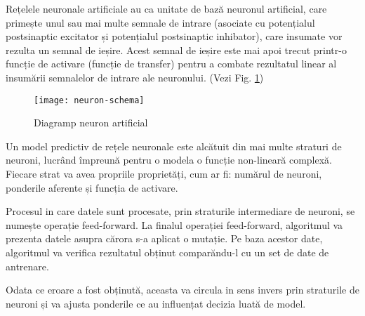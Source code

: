 	
	Rețelele neuronale artificiale au ca unitate de bază neuronul artificial, care primește unul sau mai multe semnale de intrare (asociate cu potențialul postsinaptic excitator și potențialul postsinaptic inhibator), care insumate vor rezulta un semnal de ieșire. Acest semnal de ieșire este mai apoi trecut printr-o funcție de activare (funcție de transfer) pentru a combate rezultatul linear al insumării semnalelor de intrare ale neuronului. (Vezi Fig. \ref{fig:neuron-schema})
	
	\begin{figure}[H]
		\texttt{[image: neuron-schema]}  
		\caption{\label{fig:neuron-schema} Diagramp neuron artificial 
		\protect 
		\cite{ann}}
	\end{figure}
	
	
	Un model predictiv de rețele neuronale este alcătuit din mai multe straturi de neuroni, lucrând împreună pentru o modela o funcție non-lineară complexă.
	Fiecare strat va avea propriile proprietăți, cum ar fi: numărul de neuroni, ponderile aferente și funcția de activare.
	
	Procesul in care datele sunt procesate, prin straturile intermediare de neuroni, se numește operație feed-forward. La finalul operației feed-forward, algoritmul va prezenta datele asupra cărora s-a aplicat o mutație. Pe baza acestor date, algoritmul va verifica rezultatul obținut comparăndu-l cu un set de date de antrenare. 
	
	Odata ce eroare a fost obținută, aceasta va circula in sens invers prin straturile de neuroni și va ajusta ponderile ce au influențat decizia luată de model.
	
	

